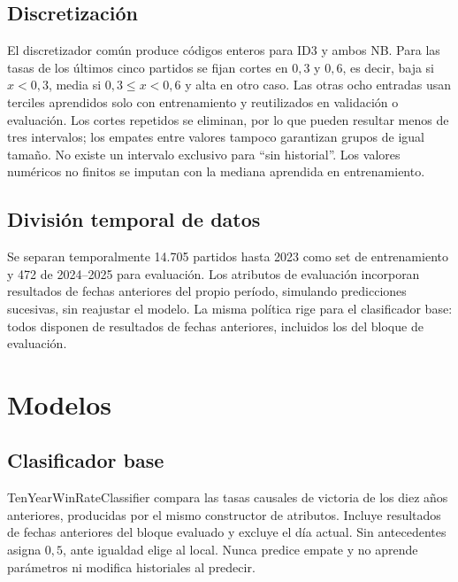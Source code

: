 \documentclass[conference]{IEEEtran}
\begin{document}
\subsection{Discretización}
El discretizador común produce códigos enteros para ID3 y ambos NB. Para las tasas de los últimos cinco partidos se fijan cortes en $0{,}3$ y $0{,}6$, es decir, baja si $x<0{,}3$, media si $0{,}3\leq x<0{,}6$ y alta en otro caso. Las otras ocho entradas usan terciles aprendidos solo con entrenamiento y reutilizados en validación o evaluación. Los cortes repetidos se eliminan, por lo que pueden resultar menos de tres intervalos; los empates entre valores tampoco garantizan grupos de igual tamaño. No existe un intervalo exclusivo para ``sin historial''. Los valores numéricos no finitos se imputan con la mediana aprendida en entrenamiento.

\subsection{División temporal de datos}
Se separan temporalmente 14.705 partidos hasta 2023 como set de entrenamiento y 472 de 2024--2025 para evaluación. Los atributos de evaluación incorporan resultados de fechas anteriores del propio período, simulando predicciones sucesivas, sin reajustar el modelo. La misma política rige para el clasificador base: todos disponen de resultados de fechas anteriores, incluidos los del bloque de evaluación.

\section{Modelos}
\label{sec:modelos}

\subsection{Clasificador base}
TenYearWinRateClassifier compara las tasas causales de victoria de los diez años anteriores, producidas por el mismo constructor de atributos. Incluye resultados de fechas anteriores del bloque evaluado y excluye el día actual. Sin antecedentes asigna $0{,}5$, ante igualdad elige al local. Nunca predice empate y no aprende parámetros ni modifica historiales al predecir.
\end{document}
